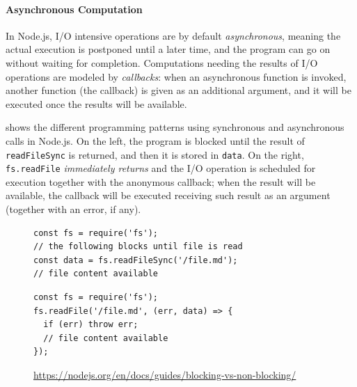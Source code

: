 \paragraph{Asynchronous Computation}
In Node.js, %
I/O intensive operations are by default \emph{asynchronous}, meaning the actual execution is postponed until a later time, and the program can go on without waiting for completion.
Computations needing the results of I/O operations are modeled by \emph{callbacks}: when an asynchronous function is invoked, another function (the callback) is given as an additional argument, and it will be executed once the results will be available.

 shows the different programming patterns using synchronous and asynchronous calls in Node.js.
On the left, the program is blocked until the result of \lstinline{readFileSync} is returned, and then it is stored in \lstinline{data}.
On the right, \lstinline{fs.readFile} \emph{immediately returns} and the I/O operation is scheduled for execution together with the anonymous callback; when the result will be available, the callback will be executed receiving such result as an argument (together with an error, if any).

\begin{figure}[h]
\begin{minipage}{.5\textwidth}
\begin{lstlisting}
const fs = require('fs');
// the following blocks until file is read
const data = fs.readFileSync('/file.md');
// file content available
\end{lstlisting}
\end{minipage}
\begin{minipage}{.5\textwidth}
\begin{lstlisting}
const fs = require('fs');
fs.readFile('/file.md', (err, data) => {
  if (err) throw err;
  // file content available
});
\end{lstlisting}
\end{minipage}
\caption{
  \url{https://nodejs.org/en/docs/guides/blocking-vs-non-blocking/}}
\label{lst:async}
\end{figure}

